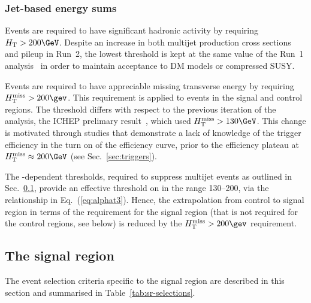 \subsubsection{Jet-based energy sums}
\label{sec:energysums}

Events are required to have significant hadronic activity by requiring
$\scalht > 200\GeV$. Despite an increase in both multijet production
cross sections and pileup in Run~2, the lowest \HT threshold is kept
at the same value of the Run~1 analysis~\cite{Chatrchyan:2013lya} in
order to maintain acceptance to DM models or compressed SUSY.

Events are required to have appreciable missing transverse energy by
requiring $\mht>200\gev$. This requirement is applied to events in the
signal and control regions. The threshold differs with respect to the
previous iteration of the analysis, the ICHEP prelimary
result~\cite{CMS-PAS-SUS-16-016}, which used $\HTmiss > 130\GeV$. This
change is motivated through studies that demonstrate a lack of
knowledge of the trigger efficiency in the turn on of the efficiency
curve, prior to the efficiency plateau at $\HTmiss \approx 200\GeV$
(see Sec.~\ref{sec:triggers}).

The \scalht-dependent \alphat thresholds, required to suppress
multijet events as outlined in Sec.~\ref{sec:had-signal}, provide an
effective threshold on \mht in the range 130--200\GeV, via the
relationship in Eq.~(\ref{eq:alphat3}). Hence, the extrapolation from
control to signal region in terms of the \alphat requirement for the
signal region (that is not required for the control regions, see
below) is reduced by the $\mht>200\gev$ requirement.  

\subsection{The signal region}
\label{sec:had-signal}

The event selection criteria specific to the signal region are
described in this section and summarised in
Table~\ref{tab:sr-selections}.

